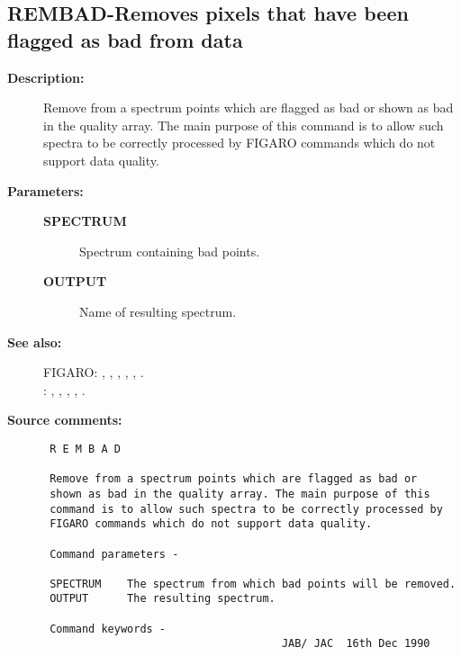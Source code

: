 \subsection{REMBAD-\label{REMBAD}Removes pixels that have been flagged as bad from data}
\begin{description}

\item [{\bf Description:}]
 Remove from a spectrum points which are flagged as bad or
 shown as bad in the quality array. The main purpose of this
 command is to allow such spectra to be correctly processed
 by FIGARO commands which do not support data quality.

\item [{\bf Parameters:}]
\begin{description}
\item [{\bf SPECTRUM}]
 Spectrum containing bad points.
\item [{\bf OUTPUT}]
 Name of resulting spectrum.
\end{description}

\item [{\bf See also:}]
FIGARO: , , , , , .\\
: , , , , .\\

\item [{\bf Source comments:}]
\begin{verbatim}
 R E M B A D

 Remove from a spectrum points which are flagged as bad or
 shown as bad in the quality array. The main purpose of this
 command is to allow such spectra to be correctly processed by
 FIGARO commands which do not support data quality.

 Command parameters -

 SPECTRUM    The spectrum from which bad points will be removed.
 OUTPUT      The resulting spectrum.

 Command keywords -
                                     JAB/ JAC  16th Dec 1990
\end{verbatim}
\end{description}
